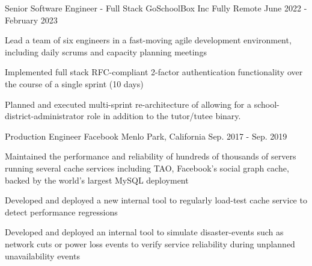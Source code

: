 \begin{cventries}
  \cventry
    {Senior Software Engineer - Full Stack}
    {\hspace{0.7em}GoSchoolBox Inc}
    {Fully Remote}
    {June 2022 - February 2023}
    {
      \begin{cvitems}
        \item {
          Lead a team of six engineers in a fast-moving agile development environment, 
          including daily scrums and capacity planning meetings
        }
        \item {
          Implemented full stack RFC-compliant 2-factor
          authentication functionality over the course of a single sprint (10 days)
        }
        \item {
          Planned and executed multi-sprint re-architecture of allowing for a
          school-district-administrator role in addition to the tutor/tutee binary.
        }
      \end{cvitems}
    }


  \cventry
    {Production Engineer} %
    {
      \hspace{0.7em}
      Facebook
    } %
    {Menlo Park, California} %
    {Sep. 2017 - Sep. 2019} %
    {
      \begin{cvitems} %
        \item {
          Maintained the performance and reliability of hundreds of thousands
          of servers running several cache services including TAO, Facebook's
          social graph cache, backed by the world's largest MySQL deployment
        }
        \item {
          Developed and deployed a new internal tool to regularly
          load-test cache service to detect performance regressions
        } 
        \item {
          Developed and deployed an internal tool to simulate disaster-events
          such as network cuts or power loss events to verify service
          reliability during unplanned unavailability events
        }
      \end{cvitems}
    }


\end{cventries}
